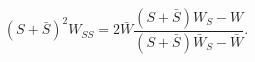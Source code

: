 \begin{equation}
(S+\bar S)^2W_{SS} = 2 \bar W \frac{(S+\bar S)W_S-W }
{(S+\bar S)\bar W_S-\bar W } .
\label{sol-2}
\end{equation}

